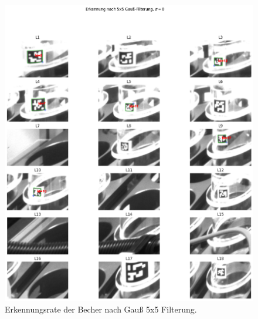     \begin{figure}
        \caption[Erkennungsrate der Becher mit Gauß 5x5]{\small Erkennungsrate der Becher nach Gauß 5x5 Filterung.}\label{fig:figure23}
        \includegraphics[width = \textwidth]{Bilder/ErkennungsrateGauss.png}
        \centering
    \end{figure}


